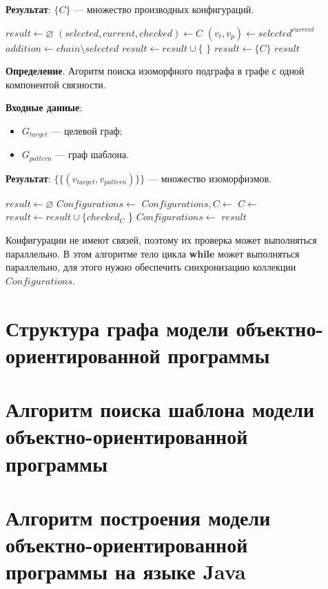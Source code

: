 \textbf{Результат}: $\{ C \}$ --- множество производных конфигураций.

\begin{algorithmic}
\State $result \gets \varnothing$
\State $(selected, current, checked) \gets C$
\State $(v_t, v_p) \gets selected^{current}$
    \State $addition \gets chain \setminus selected$
        \State $result \gets result \cup \{ $  $ \}$
    \EndIf
\EndFor
{}
    \State $result \gets \{ C \}$
\EndIf
\State \Return $result$
\EndFunction
\end{algorithmic}

\textbf{Определение}. Агоритм поиска изоморфного подграфа в графе с одной компонентой связности.

\textbf{Входные данные}:
\begin{itemize}
\item $G_{target}$ --- целевой граф;
\item $G_{pattern}$ --- граф шаблона.
\end{itemize}

\textbf{Результат}: $\{ \{ ( v_{target}, v_{pattern} ) \} \}$ --- множество
изоморфизмов.

\begin{algorithmic}
    \State $result \gets \varnothing$
    \State $Configurations \gets$ 
        \State $Configurations, C \gets$ 
        \State $C \gets$ 
                \State $result \gets result \cup \{ checked_C$ \}
            \EndIf
        \Else
            \State $Configurations \gets$ 
        \EndIf
    \EndWhile
    \State \Return $result$
\EndFunction
\end{algorithmic}

Конфигурации не имеют связей, поэтому их проверка может выполняться параллельно.
В этом алгоритме тело цикла \textbf{while} может выполняться параллельно,
для этого нужно обеспечить синхронизацию коллекции $Configurations$.

\section{Структура графа модели объектно-ориентированной программы}
\section{Алгоритм поиска шаблона модели объектно-ориентированной программы}
\section{Алгоритм построения модели объектно-ориентированной программы на языке Java}
